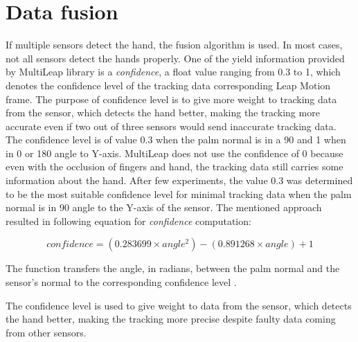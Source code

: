 \section{Data fusion}

If multiple sensors detect the hand, the fusion algorithm is used. In most cases, not all sensors detect the hands properly. One of the yield information provided by MultiLeap library is a \textit{confidence}, a float value ranging from 0.3 to 1, which denotes the confidence level of the tracking data corresponding Leap Motion frame. The purpose of confidence level is to give more weight to tracking data from the sensor, which detects the hand better, making the tracking more accurate even if two out of three sensors would send inaccurate tracking data. The confidence level is of value 0.3 when the palm normal is in a 90\textdegree \xspace and 1 when in 0\textdegree \xspace or 180\textdegree \xspace angle to Y-axis. MultiLeap does not use the confidence of 0 because even with the occlusion of fingers and hand, the tracking data still carries some information about the hand. After few experiments, the value 0.3 was determined to be the most suitable confidence level for minimal tracking data when the palm normal is in 90\textdegree \xspace angle to the Y-axis of the sensor. The mentioned approach resulted in following equation for \textit{confidence} computation:

\begin{equation}
    {confidence = (0.283699 \times angle^2)-(0.891268 \times angle)+1}
\end{equation}

The function transfers the angle, in radians, between the palm normal and the sensor's normal to the corresponding confidence level \cite{tomasMultileap}.

The confidence level is used to give weight to data from the sensor, which detects the hand better, making the tracking more precise despite faulty data coming from other sensors.
